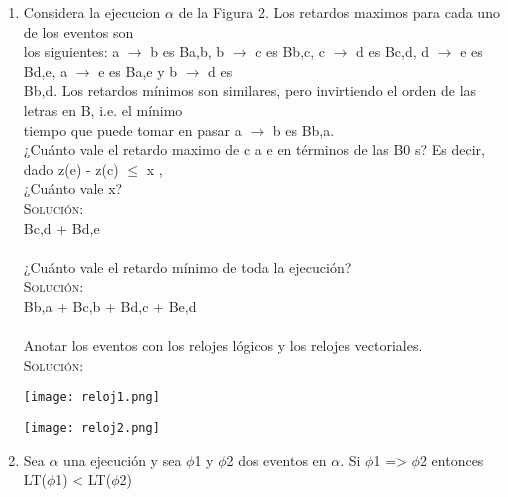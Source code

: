 \documentclass[letterpaper,10pt]{article}
\begin{document}
\begin{enumerate}
   \item Considera la ejecucion $\alpha$ de la Figura 2. Los retardos maximos para cada uno de los eventos son\\ 
   los siguientes: a $\longrightarrow$ b es Ba,b, b $\longrightarrow$ c es Bb,c, c $\longrightarrow$ d es Bc,d, d $\longrightarrow$ e es Bd,e, a $\longrightarrow$ e es Ba,e y b $\longrightarrow$ d es\\	   Bb,d. Los retardos mínimos son similares, pero invirtiendo el orden de las letras en B, i.e. el mínimo\\
	tiempo que puede tomar en pasar a $\longrightarrow$ b es Bb,a.
	\\	
	¿Cuánto vale el retardo maximo de c a e en términos de las B0 s? Es decir, dado z(e) - z(c) $\leq$ x ,\\
	¿Cuánto vale x?\\
    \textsc{Solución:}
    \\
	Bc,d + Bd,e
	\\
	\\
	¿Cuánto vale el retardo mínimo de toda la ejecución?\\
	\textsc{Solución:}
    \\
	Bb,a + Bc,b + Bd,c + Be,d \\
	\\
	Anotar los eventos con los relojes lógicos y los relojes vectoriales.\\
	\textsc{Solución:}
    \\
	\begin{center}
    \texttt{[image: reloj1.png]}\\
    \end{center}
    
    \begin{center}
    \texttt{[image: reloj2.png]}\\
    \end{center}
	
   \item Sea $\alpha$ una ejecución y sea $\phi$1 y $\phi$2 dos eventos en $\alpha$. Si $\phi$1 => $\phi$2 entonces LT($\phi$1) < LT($\phi$2)
	
    
	
	\end{enumerate} 
\end{document}
